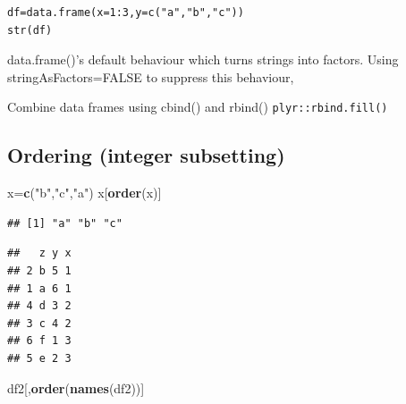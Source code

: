 \documentclass[
]{book}
\newenvironment{Shaded}{\begin{snugshade}}{\end{snugshade}}
\newcommand{\DataTypeTok}[1]{\textcolor[rgb]{0.13,0.29,0.53}{#1}}
\newcommand{\DecValTok}[1]{\textcolor[rgb]{0.00,0.00,0.81}{#1}}
\newcommand{\KeywordTok}[1]{\textcolor[rgb]{0.13,0.29,0.53}{\textbf{#1}}}
\newcommand{\NormalTok}[1]{#1}
\newcommand{\OperatorTok}[1]{\textcolor[rgb]{0.81,0.36,0.00}{\textbf{#1}}}
\newcommand{\StringTok}[1]{\textcolor[rgb]{0.31,0.60,0.02}{#1}}
\theoremstyle{definition}
\theoremstyle{definition}
\theoremstyle{definition}
\theoremstyle{remark}
\begin{document}
\begin{verbatim}
df=data.frame(x=1:3,y=c("a","b","c"))
str(df)
\end{verbatim}

data.frame()'s default behaviour which turns strings into factors. Using stringAsFactors=FALSE to suppress this behaviour,

Combine data frames using cbind() and rbind()
\texttt{plyr::rbind.fill()}

\hypertarget{ordering-integer-subsetting}{%
\subsection{Ordering (integer subsetting)}\label{ordering-integer-subsetting}}

\begin{Shaded}
\begin{Highlighting}[]
\NormalTok{x=}\KeywordTok{c}\NormalTok{(}\StringTok{"b"}\NormalTok{,}\StringTok{"c"}\NormalTok{,}\StringTok{"a"}\NormalTok{)}
\NormalTok{x[}\KeywordTok{order}\NormalTok{(x)]}
\end{Highlighting}
\end{Shaded}

\begin{verbatim}
## [1] "a" "b" "c"
\end{verbatim}

\begin{Shaded}
\end{Shaded}

\begin{verbatim}
##   z y x
## 2 b 5 1
## 1 a 6 1
## 4 d 3 2
## 3 c 4 2
## 6 f 1 3
## 5 e 2 3
\end{verbatim}

\begin{Shaded}
\begin{Highlighting}[]
\NormalTok{df2[,}\KeywordTok{order}\NormalTok{(}\KeywordTok{names}\NormalTok{(df2))]}
\end{Highlighting}
\end{Shaded}
\end{document}
